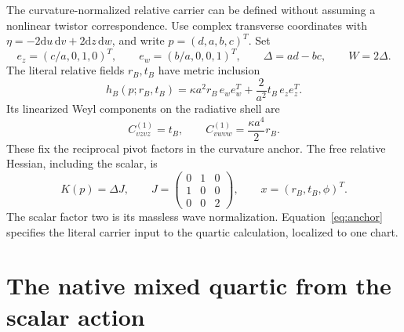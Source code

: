 \documentclass[11pt]{article}
\newcommand{\dd}{\mathrm d}
\begin{document}
The curvature-normalized relative carrier can be defined without assuming a nonlinear twistor correspondence.
Use complex transverse coordinates with \(\eta=-2\dd u\,\dd v+2\dd z\,\dd w\), and write \(p=(d,a,b,c)^T\).
Set
\begin{equation}
 e_z=(c/a,0,1,0)^T,\qquad e_w=(b/a,0,0,1)^T,
 \qquad \Delta=ad-bc,\qquad W=2\Delta.
 \label{eq:ezew}
\end{equation}
The literal relative fields \(r_B,t_B\) have metric inclusion
\begin{equation}
 \boxed{h_B(p;r_B,t_B)=\kappa a^2r_B\,e_we_w^T
                         +\frac{2}{a^2}t_B\,e_ze_z^T.}
 \label{eq:anchor}
\end{equation}
Its linearized Weyl components on the radiative shell are
\begin{equation}
 C^{(1)}_{vzvz}=t_B,\qquad
 C^{(1)}_{vwvw}=\frac{\kappa a^4}{2}r_B.
 \label{eq:weyl-anchor}
\end{equation}
These fix the reciprocal pivot factors in the curvature anchor.
The free relative Hessian, including the scalar, is
\begin{equation}
 K(p)=\Delta J,\qquad
 J=\begin{pmatrix}0&1&0\\1&0&0\\0&0&2\end{pmatrix},\qquad
 x=(r_B,t_B,\phi)^T.
 \label{eq:relative-K}
\end{equation}
The scalar factor two is its massless wave normalization.
Equation~\eqref{eq:anchor} specifies the literal carrier input to the quartic calculation, localized to one chart.

\section{The native mixed quartic from the scalar action}
\label{sec:native}
\end{document}
